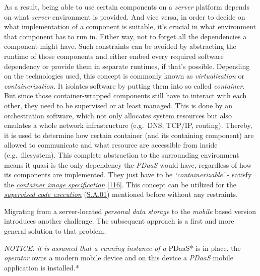 \documentclass[12pt,english,a4paper,titlepage,cleardoublepage=empty,dottedtoc]{report}
\begin{document}
As a result, being able to use certain components on a \emph{server}
platform depends on what \emph{server} environment is provided. And vice
versa, in order to decide on what implementation of a component is
suitable, it's crucial in what environment that component has to run in.
Either way, not to forget all the dependencies a component might have.
Such constraints can be avoided by abstracting the runtime of those
components and either embed every required software dependency or
provide them in separate runtimes, if that's possible. Depending on the
technologies used, this concept is commonly known as
\emph{virtualization} or \emph{containerization}. It isolates software
by putting them into so called \emph{container}. But since those
container-wrapped components still have to interact with each other,
they need to be supervised or at least managed. This is done by an
orchestration software, which not only allocates system resources but
also emulates a whole network infrastructure (e.g.~DNS, TCP/IP,
routing). Thereby, it is used to determine how certain container (and
its containing component) are allowed to communicate and what resource
are accessible from inside (e.g.~filesystem). This complete abstraction
to the surrounding environment means it quasi is the only dependency the
\emph{PDaaS} would have, regardless of how its components are
implemented. They just have to be \emph{`containerizable'} - satisfy the
\emph{\protect\hyperlink{link-container}{container image specification}}
{[}\protect\hyperlink{ref-web_oci-spec_image}{116}{]}. This concept can
be utilized for the
\emph{\protect\hyperlink{supervised-data-access}{supervised code
execution}} (\protect\hyperlink{sa01}{S.A.01}) mentioned before without
any restraints.

Migrating from a server-located \emph{personal data storage} to the
\emph{mobile} based version introduces another challenge. The subsequent
approach is a first and more general solution to that problem.

\emph{NOTICE: it is assumed that a running instance of a }PDaaS* is in
place, the \emph{operator} owns a modern mobile device and on this
device a \emph{PDaaS} mobile application is installed.*
\end{document}
